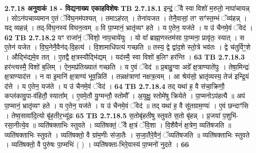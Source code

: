 \documentclass[17pt]{extarticle}
\begin{document}
{{                \textbf{ 2.7.18     अनुवाकं   18 - विद्यनाख्य एकाहविशेषः} \newline
                                \textbf{ TB 2.7.18.1} \newline
                  इन्द्रं॒ ॅवै स्वा विशो॑ म॒रुतो॒ नापा॑चायन्न् । सोऽन॑पचाय्यमान ए॒तं ॅवि॑घ॒नम॑पश्यत् । तमाऽह॑रत् । तेना॑यजत । तेनै॒वासां॒ तꣳ सꣳ॑स्त॒म्भं ॅव्य॑हन्न् । यद् व्यहन्न्॑ । तद्-वि॑घ॒नस्य॑ विघन॒त्वम् ॥ वि पा॒प्मानं॒ भ्रातृ॑व्यꣳ हते । य ए॒तेन॒ यज॑ते । य उ॑ चैनमे॒वं ॅवेद॑ । \textbf{ 62} \newline
                  \newline
                                \textbf{ TB 2.7.18.2} \newline
                  यꣳ राजा॑नं॒ ॅविशो॒ नाप॒चाये॑युः । यो वा᳚ ब्राह्म॒णस्तम॑सा पा॒प्मना॒ प्रावृ॑तः॒ स्यात् । स ए॒तेन॑ यजेत । वि॒घ॒नेनै॒वैन॑द्-वि॒हत्य॑ । वि॒शामाधि॑पत्यं गच्छति ॥ तस्य॒ द्वे द्वा॑द॒शे स्तो॒त्रे भव॑तः । द्वे च॑तुर्विꣳ॒॒शे । औद्भि॑द्यमे॒व तत् । ए॒तद्वै क्ष॒त्रस्यौद्भि॑द्यम् । यद॑स्मै॒ स्वा विशो॑ ब॒लिꣳ हर॑न्ति । \textbf{ 63} \newline
                  \newline
                                \textbf{ TB 2.7.18.3} \newline
                  हर॑न्त्यस्मै॒ विशो॑ ब॒लिम् । ऐन॒मप्र॑तिख्यातं गच्छति । य ए॒वं ॅवेद॑ ॥ प्र॒बाहु॒ग्वा अग्रे᳚ क्ष॒त्राण्याते॑पुः । तेषा॒मिन्द्रः॑ क्ष॒त्राण्याद॑त्त । न वा इ॒मानि॑ क्ष॒त्राण्य॑ भूव॒न्निति॑ । तन्नक्ष॑त्राणां नक्षत्र॒त्वम् । आ श्रेय॑सो॒ भ्रातृ॑व्यस्य॒ तेज॑ इन्द्रि॒यं द॑त्ते । य ए॒तेन॒ यज॑ते । य उ॑ चैनमे॒वं ॅवेद॑ । \textbf{ 64} \newline
                  \newline
                                \textbf{ TB 2.7.18.4} \newline
                  तद् यथा॑ ह॒ वै स॑चा॒क्रिणौ॒ कप्ल॑कावु॒पा-व॑हितौ॒ स्याता᳚म् । ए॒वमे॒तौ यु॒ग्मन्तौ॒ स्तोमौ᳚ । अ॒युक्षु॒ स्तोमे॑षु क्रियेते । पा॒प्मनोऽप॑हत्यै ॥ अप॑ पा॒प्मानं॒ भ्रातृ॑व्यꣳ हते । य ए॒तेन॒ यज॑ते । य उ॑ चैनमे॒वं ॅवेद॑ ॥ तद् यथा॑ ह॒ वै सू॑तग्राम॒ण्यः॑ । ए॒वं छन्दाꣳ॑सि । तेष्व॒सावा॑दि॒त्यो बृ॑ह॒तीर॒भ्यू॑ढः \textbf{ 65} \newline
                  \newline
                                \textbf{ TB 2.7.18.5} \newline
                  स॒तोबृ॑हतीषु स्तुवते स॒तो बृ॑हन्न् । प्र॒जया॑ प॒शुभि॑-रसा॒नीत्ये॒व ॥ व्यति॑षक्ताभिः स्तुवते । व्यति॑षक्तं॒ ॅवै क्ष॒त्रं ॅवि॒शा । वि॒शैवैनं॑ क्ष॒त्रेण॒ व्यति॑षजति ॥ व्यति॑षक्ताभिः स्तुवते । व्यति॑षक्तो॒ वै ग्रा॑म॒णीः स॑जा॒तैः । स॒जा॒तैरे॒वैनं॒ ॅव्यति॑षजति ॥ व्यति॑षक्ताभिः स्तुवते । व्यति॑षक्तो॒ वै पुरु॑षः पा॒प्मभिः॑ ( ) । व्यति॑षक्ता-भिरे॒वास्य॑ पा॒प्मनो॑ नुदते । \textbf{ 66} \newline
}}
\end{document}
